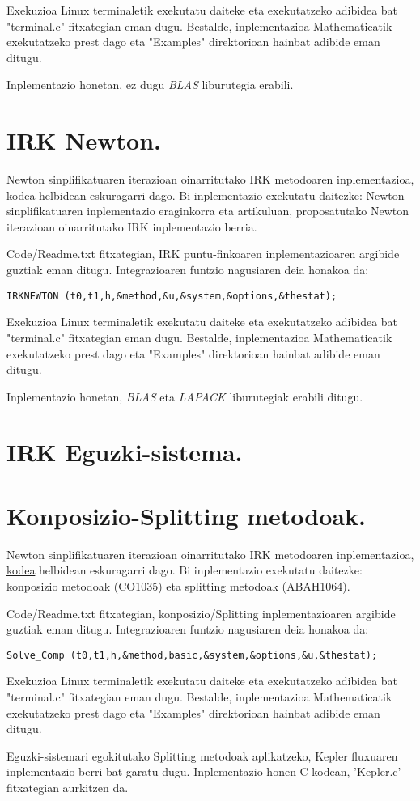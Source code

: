 Exekuzioa Linux terminaletik exekutatu daiteke eta exekutatzeko adibidea bat  "terminal.c" fitxategian eman dugu. 
Bestalde, inplementazioa Mathematicatik exekutatzeko prest dago eta "Examples" direktorioan hainbat adibide eman ditugu.    

Inplementazio honetan, ez dugu \emph{BLAS} liburutegia erabili. 

\section{IRK Newton.}

Newton sinplifikatuaren iterazioan oinarritutako IRK metodoaren inplementazioa, \href{https://github.com/mikelehu/IRK-Newton}{kodea} helbidean eskuragarri dago. Bi inplementazio exekutatu daitezke: Newton sinplifikatuaren inplementazio eraginkorra eta artikuluan, proposatutako Newton iterazioan oinarritutako IRK inplementazio berria.

Code/Readme.txt fitxategian, IRK puntu-finkoaren inplementazioaren argibide guztiak eman ditugu. Integrazioaren funtzio nagusiaren deia honakoa da:   
\begin{lstlisting}
IRKNEWTON (t0,t1,h,&method,&u,&system,&options,&thestat);
\end{lstlisting}

Exekuzioa Linux terminaletik exekutatu daiteke eta exekutatzeko adibidea bat  "terminal.c" fitxategian eman dugu. 
Bestalde, inplementazioa Mathematicatik exekutatzeko prest dago eta "Examples" direktorioan hainbat adibide eman ditugu. 

Inplementazio honetan, \emph{BLAS} eta \emph{LAPACK} liburutegiak erabili ditugu.

\section{IRK Eguzki-sistema.}

\section{Konposizio-Splitting metodoak.}

Newton sinplifikatuaren iterazioan oinarritutako IRK metodoaren inplementazioa, \href{https://github.com/mikelehu/Composition}{kodea} helbidean eskuragarri dago. Bi inplementazio exekutatu daitezke: konposizio metodoak (CO1035) eta splitting metodoak (ABAH1064).

Code/Readme.txt fitxategian, konposizio/Splitting inplementazioaren argibide guztiak eman ditugu. Integrazioaren funtzio nagusiaren deia honakoa da:   
\begin{lstlisting}
Solve_Comp (t0,t1,h,&method,basic,&system,&options,&u,&thestat);
\end{lstlisting}

Exekuzioa Linux terminaletik exekutatu daiteke eta exekutatzeko adibidea bat  "terminal.c" fitxategian eman dugu. 
Bestalde, inplementazioa Mathematicatik exekutatzeko prest dago eta "Examples" direktorioan hainbat adibide eman ditugu. 

Eguzki-sistemari egokitutako Splitting metodoak aplikatzeko, Kepler fluxuaren inplementazio berri bat garatu dugu. Inplementazio honen C kodean, 'Kepler.c' fitxategian aurkitzen da. 
